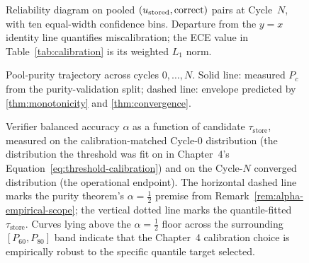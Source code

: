 \begin{figure}[t]
\centering
{}
\caption{Reliability diagram on pooled $(u_{\text{stored}}, \mathrm{correct})$
pairs at Cycle~$N$, with ten equal-width confidence bins. Departure
from the $y=x$ identity line quantifies miscalibration; the ECE
value in Table~\ref{tab:calibration} is its weighted $L_1$ norm.}
\label{fig:reliability}
\end{figure}

\begin{figure}[t]
\centering
{}
\caption{Pool-purity trajectory across cycles $0,\ldots,N$.
Solid line: measured $P_c$ from the purity-validation split; dashed
line: envelope predicted by \cref{thm:monotonicity} and
\cref{thm:convergence}.}
\label{fig:purity-trajectory}
\end{figure}

\begin{figure}[t]
\centering
{}
\caption{Verifier balanced accuracy $\alpha$ as a function of candidate
$\tau_{\text{store}}$, measured on the calibration-matched Cycle-0
distribution (the distribution the threshold was fit on in
Chapter~4's Equation~\ref{eq:threshold-calibration}) and on the
Cycle-$N$ converged distribution (the operational endpoint).
The horizontal dashed line marks the purity theorem's
$\alpha = \tfrac{1}{2}$ premise from
Remark~\ref{rem:alpha-empirical-scope}; the vertical dotted line
marks the quantile-fitted $\tau_{\text{store}}$. Curves lying above
the $\alpha = \tfrac{1}{2}$ floor across the surrounding
$[P_{60}, P_{80}]$ band indicate that the Chapter~4 calibration
choice is empirically robust to the specific quantile target
selected.}
\label{fig:alpha-vs-tau}
\end{figure}

